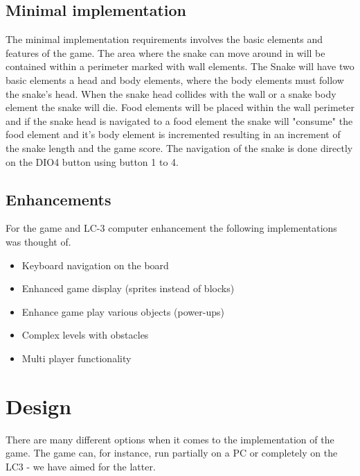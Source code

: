 \documentclass{acm_proc_article-sp}
\begin{document}
\subsection{Minimal implementation}
The minimal implementation requirements involves the basic elements and features of the game. The area where the snake can move around in will be contained within a perimeter marked with wall elements.  The Snake will have two basic elements a head and body elements, where the body elements must follow the snake's head. When the snake head collides with the wall or a snake body element the snake will die. Food elements will be placed within the wall perimeter and if the snake head is navigated to a food element the snake will "consume" the food element and it's body element is incremented resulting in an increment of the snake length and the game score. The navigation of the snake is done directly on the DIO4 button using button 1 to 4.  


\subsection{Enhancements}
For the game and LC-3 computer enhancement the following implementations was thought of. 

\begin{itemize}
\item Keyboard navigation on the board 
\item Enhanced game display (sprites instead of blocks) 
\item Enhance game play various objects (power-ups)  
\item Complex levels with obstacles
\item Multi player functionality 
\end{itemize}

\section{Design}
There are many different options when it comes to the implementation of the game. The game can, for instance, run partially on a PC or completely on the LC3 - we have aimed for the latter.
\end{document}

